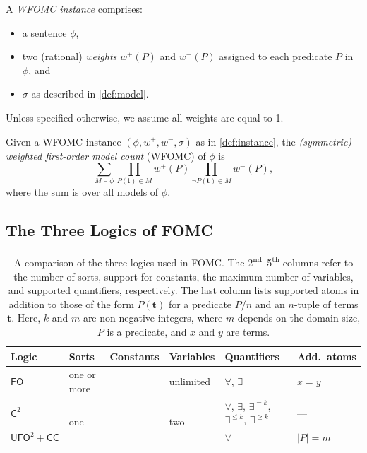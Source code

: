 \documentclass[a4paper,UKenglish,cleveref,autoref,table]{lipics-v2021}
\newcommand{\cmark}{\ding{51}}
\newcommand{\xmark}{\ding{55}}
\newcommand{\Ctwo}{$\mathsf{C}^{2}$}
\newcommand{\FO}{$\mathsf{FO}$}
\newcommand{\UFO}{$\mathsf{UFO}^{2} + \mathsf{CC}$}
\begin{document}
\begin{definition}\label{def:instance}
  A \emph{WFOMC instance} comprises:
  \begin{itemize}
    \item a sentence $\phi$,
    \item two (rational) \emph{weights} $w^{+}(P)$ and $w^{-}(P)$ assigned to
          each predicate $P$ in $\phi$, and
    \item $\sigma$ as described in \cref{def:model}.
  \end{itemize}
  Unless specified otherwise, we assume all weights are equal to 1.
\end{definition}

\begin{definition}
  Given a WFOMC instance $(\phi, w^{+}, w^{-}, \sigma)$ as in
  \cref{def:instance}, the \emph{(symmetric) weighted first-order model count}
  (WFOMC) of $\phi$ is
  \begin{equation}\label{eq:wfomc}
    \sum_{M \models \phi} \prod_{P(\mathbf{t}) \in M} w^{+}(P) \prod_{\neg P(\mathbf{t}) \in M} w^{-}(P),
  \end{equation}
  where the sum is over all models of $\phi$.
\end{definition}

\subsection{The Three Logics of FOMC}\label{sec:threelogics}

\begin{table}[t]
  \centering
  \caption{A comparison of the three logics used in FOMC\@. The
    2\textsuperscript{nd}--5\textsuperscript{th} columns refer to the number of
    sorts, support for constants, the maximum number of variables, and supported
    quantifiers, respectively. The last column lists supported atoms in addition
    to those of the form $P(\mathbf{t})$ for a predicate $P/n$ and an $n$-tuple
    of terms $\mathbf{t}$. Here, $k$ and $m$ are non-negative integers, where
    $m$ depends on the domain size, $P$ is a predicate, and $x$ and $y$ are
    terms.}\label{tbl:logics}
  \begin{tabular}{llclll}
    \toprule
    Logic & Sorts & Constants & Variables & Quantifiers & Add.\ atoms\\
    \midrule
    \rowcolor{gray!10}
    \FO & one or more & \cmark & unlimited & $\forall$, $\exists$ & $x = y$\\
    \Ctwo & \multirow{2}{*}{one} & \multirow{2}{*}{\xmark} & \multirow{2}{*}{two} & $\forall$, $\exists$, $\exists^{= k}$, $\exists^{\le k}$, $\exists^{\ge k}$ & ---\\
    \UFO & & & & $\forall$ & $|P| = m$\\
    \bottomrule
  \end{tabular}
\end{table}
\end{document}
